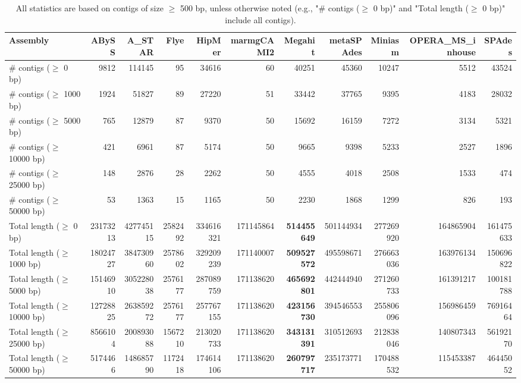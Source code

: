 \documentclass[12pt,a4paper]{article}
\begin{document}
\begin{table}[ht]
\begin{center}
\caption{All statistics are based on contigs of size $\geq$ 500 bp, unless otherwise noted (e.g., "\# contigs ($\geq$ 0 bp)" and "Total length ($\geq$ 0 bp)" include all contigs).}
\begin{tabular}{|l*{10}{|r}|}
\hline
Assembly & ABySS & A\_STAR & Flye & HipMer & marmgCAMI2 & Megahit & metaSPAdes & Miniasm & OPERA\_MS\_inhouse & SPAdes \\ \hline
\# contigs ($\geq$ 0 bp) & 9812 & 114145 & 95 & 34616 & 60 & 40251 & 45360 & 10247 & 5512 & 43524 \\ \hline
\# contigs ($\geq$ 1000 bp) & 1924 & 51827 & 89 & 27220 & 51 & 33442 & 37765 & 9395 & 4183 & 28032 \\ \hline
\# contigs ($\geq$ 5000 bp) & 765 & 12879 & 87 & 9370 & 50 & 15692 & 16159 & 7272 & 3134 & 5321 \\ \hline
\# contigs ($\geq$ 10000 bp) & 421 & 6961 & 87 & 5174 & 50 & 9665 & 9398 & 5233 & 2527 & 1896 \\ \hline
\# contigs ($\geq$ 25000 bp) & 148 & 2876 & 28 & 2262 & 50 & 4555 & 4018 & 2508 & 1533 & 474 \\ \hline
\# contigs ($\geq$ 50000 bp) & 53 & 1363 & 15 & 1165 & 50 & 2230 & 1868 & 1299 & 826 & 193 \\ \hline
Total length ($\geq$ 0 bp) & 23173213 & 427745115 & 2582492 & 334616321 & 171145864 & {\bf 514455649} & 501144934 & 277269920 & 164865904 & 161475633 \\ \hline
Total length ($\geq$ 1000 bp) & 18024727 & 384730960 & 2578602 & 329209239 & 171140007 & {\bf 509527572} & 495598671 & 276663036 & 163976134 & 150696822 \\ \hline
Total length ($\geq$ 5000 bp) & 15146910 & 305228038 & 2576177 & 287089759 & 171138620 & {\bf 465692801} & 442444940 & 271260733 & 161391217 & 100181788 \\ \hline
Total length ($\geq$ 10000 bp) & 12728825 & 263859272 & 2576177 & 257767155 & 171138620 & {\bf 423156730} & 394546553 & 255806096 & 156986459 & 76916464 \\ \hline
Total length ($\geq$ 25000 bp) & 8566104 & 200893088 & 1567210 & 213020733 & 171138620 & {\bf 343131391} & 310512693 & 212838046 & 140807343 & 56192170 \\ \hline
Total length ($\geq$ 50000 bp) & 5174466 & 148685790 & 1172418 & 174614106 & 171138620 & {\bf 260797717} & 235173771 & 170488532 & 115453387 & 46445052 \\ \hline

\end{tabular}
\end{center}
\end{table}
\end{document}
